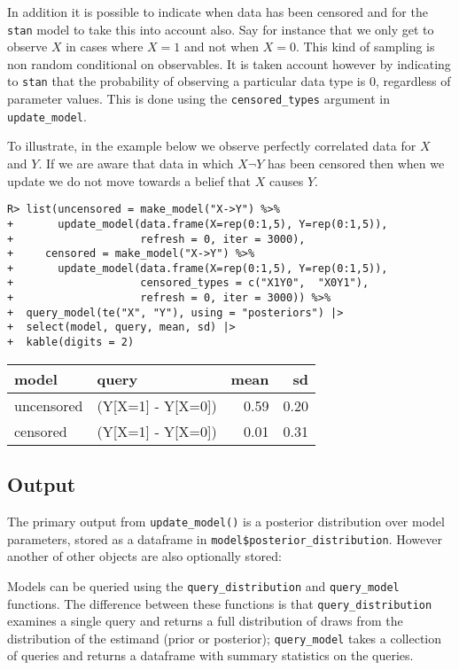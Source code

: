 \documentclass[
  11pt,
  article]{jss}
\begin{document}
In addition it is possible to indicate when data has been censored and
for the \texttt{stan} model to take this into account also. Say for
instance that we only get to observe \(X\) in cases where \(X=1\) and
not when \(X=0\). This kind of sampling is non random conditional on
observables. It is taken account however by indicating to \texttt{stan}
that the probability of observing a particular data type is 0,
regardless of parameter values. This is done using the
\texttt{censored\_types} argument in \texttt{update\_model}.

To illustrate, in the example below we observe perfectly correlated data
for \(X\) and \(Y\). If we are aware that data in which \(X \neg Y\) has
been censored then when we update we do not move towards a belief that
\(X\) causes \(Y\).

\begin{verbatim}
R> list(uncensored = make_model("X->Y") %>%
+       update_model(data.frame(X=rep(0:1,5), Y=rep(0:1,5)),
+                    refresh = 0, iter = 3000),
+     censored = make_model("X->Y") %>%
+       update_model(data.frame(X=rep(0:1,5), Y=rep(0:1,5)),
+                    censored_types = c("X1Y0",  "X0Y1"),
+                    refresh = 0, iter = 3000)) %>%
+  query_model(te("X", "Y"), using = "posteriors") |>
+  select(model, query, mean, sd) |>
+  kable(digits = 2)
\end{verbatim}

\begin{tabular}{l|l|r|r}
\hline
model & query & mean & sd\\
\hline
uncensored & (Y[X=1] - Y[X=0]) & 0.59 & 0.20\\
\hline
censored & (Y[X=1] - Y[X=0]) & 0.01 & 0.31\\
\hline
\end{tabular}

\hypertarget{output}{%
\subsection{Output}\label{output}}

The primary output from \texttt{update\_model()} is a posterior
distribution over model parameters, stored as a dataframe in
\texttt{model\$posterior\_distribution}. However another of other
objects are also optionally stored:

Models can be queried using the \texttt{query\_distribution} and
\texttt{query\_model} functions. The difference between these functions
is that \texttt{query\_distribution} examines a single query and returns
a full distribution of draws from the distribution of the estimand
(prior or posterior); \texttt{query\_model} takes a collection of
queries and returns a dataframe with summary statistics on the queries.
\end{document}
